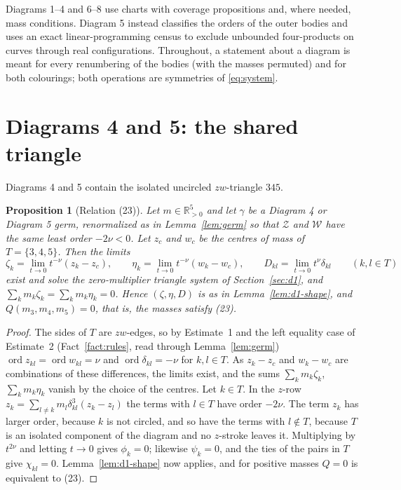 \documentclass[11pt]{amsart}
\newtheorem{proposition}[theorem]{Proposition}
\theoremstyle{definition}
\theoremstyle{remark}
\newcommand{\Rp}{\mathbb{R}_{>0}}
\newcommand{\ord}{\operatorname{ord}}
\begin{document}
Diagrams 1--4 and 6--8 use charts with coverage propositions and, where needed, mass conditions.
Diagram 5 instead classifies the orders of the outer bodies and uses an exact linear-programming
census to exclude unbounded four-products on curves through real configurations.
Throughout, a statement about a diagram is meant for every renumbering of the bodies (with the
masses permuted) and for both colourings; both operations are symmetries of
\eqref{eq:system}.











\section{Diagrams 4 and 5: the shared triangle}\label{sec:d45}

Diagrams 4 and 5 contain the isolated uncircled $zw$-triangle $345$.

\begin{proposition}[Relation (23)]\label{prop:d45-first}
Let $m\in\Rp^5$ and let $\gamma$ be a Diagram 4 or Diagram 5 germ, renormalized as in
Lemma~\ref{lem:germ} so that $\mathcal Z$ and $\mathcal W$ have the same least order $-2\nu<0$.
Let $z_c$ and $w_c$ be the centres of mass of $T=\{3,4,5\}$.  Then the limits
\[
  \zeta_k=\lim_{t\to0}t^{-\nu}(z_k-z_c),\qquad \eta_k=\lim_{t\to0}t^{-\nu}(w_k-w_c),\qquad
  D_{kl}=\lim_{t\to0}t^{\nu}\delta_{kl}\qquad(k,l\in T)
\]
exist and solve the zero-multiplier triangle system of Section~\ref{sec:d1}, and
$\sum_km_k\zeta_k=\sum_km_k\eta_k=0$.  Hence $(\zeta,\eta,D)$ is as in
Lemma~\ref{lem:d1-shape}, and $Q(m_3,m_4,m_5)=0$, that is, the masses satisfy (23).
\end{proposition}

\begin{proof}
The sides of $T$ are $zw$-edges, so by Estimate~1 and the left equality case of Estimate~2
(Fact~\ref{fact:rules}, read through Lemma~\ref{lem:germ}) $\ord z_{kl}=\ord w_{kl}=\nu$ and
$\ord\delta_{kl}=-\nu$ for $k,l\in T$.
As $z_k-z_c$ and $w_k-w_c$ are combinations of these differences, the limits exist, and the sums
$\sum_km_k\zeta_k$, $\sum_km_k\eta_k$ vanish by the choice of the centres.  Let $k\in T$.  In the
$z$-row $z_k=\sum_{l\ne k}m_l\delta_{kl}^3(z_k-z_l)$ the terms with $l\in T$ have order
$-2\nu$.  The term $z_k$ has larger order, because $k$ is not circled, and so have the terms
with $l\notin T$, because $T$ is an isolated component of the diagram and no $z$-stroke leaves
it.  Multiplying by $t^{2\nu}$ and letting $t\to0$ gives $\phi_k=0$; likewise $\psi_k=0$, and
the ties of the pairs in $T$ give $\chi_{kl}=0$.  Lemma~\ref{lem:d1-shape} now applies, and for
positive masses $Q=0$ is equivalent to (23).
\end{proof}
\end{document}
